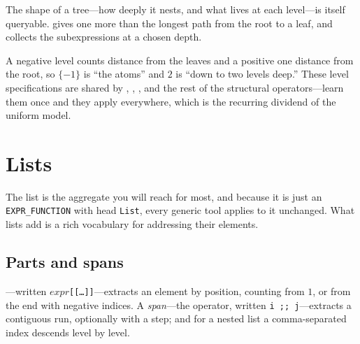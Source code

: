 The shape of a tree---how deeply it nests, and what lives at each level---is itself
queryable.  gives one more than the longest path from the
root to a leaf, and  collects the subexpressions at a chosen depth.

\begin{codepairs}
\end{codepairs}

A negative level counts distance from the leaves and a positive one distance from
the root, so \(\{-1\}\) is ``the atoms'' and \(2\) is ``down to two levels
deep.'' These level specifications are shared by ,
, , and the rest of the structural operators---learn them once
and they apply everywhere, which is the recurring dividend of the uniform model.

\section{Lists}
\label{sec:ds-lists}

The list is the aggregate you will reach for most, and because it is just an
\texttt{EXPR\_FUNCTION} with head \texttt{List}, every generic tool applies to it
unchanged. What lists add is a rich vocabulary for addressing their elements.

\subsection{Parts and spans}
\label{ssec:ds-parts}

---written \(\mathit{expr}\)\texttt{[[\ldots]]}---extracts an element by
position, counting from \(1\), or from the end with negative indices. A
\emph{span}---the  operator, written \texttt{i ;; j}---extracts
a contiguous run, optionally with a step; and for a nested list a comma-separated
index descends level by level.

